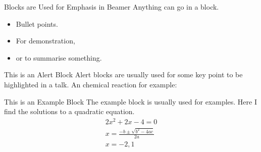 \documentclass[aspectratio=1610]{beamer}
\begin{document}
%
%
\begin{frame}
   \begin{block}{Blocks are Used for Emphasis in Beamer}
      Anything can go in a block.
      \begin{itemize}
         \item Bullet points.
         \item For demonstration,
         \item or to summarise something.
      \end{itemize}
   \end{block}
\end{frame}


\begin{frame}
   \begin{alertblock}{This is an Alert Block}
      Alert blocks are usually used for some key point to be highlighted in a talk.
      An chemical reaction for example:
   \end{alertblock}
\end{frame}


\begin{frame}
   \begin{exampleblock}{This is an Example Block}
      The example block is usually used for examples. Here I find the solutions to a quadratic equation.
      \begin{align}
         2x^2 + 2x - 4 = 0\\
         x=\frac{-b\pm\sqrt{b^2-4ac}}{2a}\\
         x=-2,1
      \end{align}
   \end{exampleblock}
\end{frame}
\end{document}
